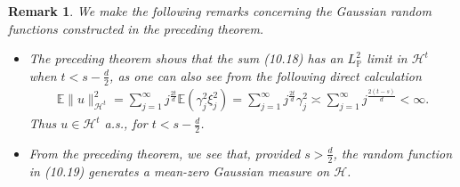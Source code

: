 \documentclass[oneside,11pt]{book}
\numberwithin{equation}{section}
\newtheorem{remark}{Remark}[section]
\begin{document}
\begin{remark}
    We make the following remarks concerning the Gaussian random functions constructed in the preceding theorem.
    \begin{itemize}
        \item The preceding theorem shows that the sum (10.18) has an $L_{\mathbb{P}}^2$ limit in $\mathcal{H}^t$ when $t < s - \frac{d}{2}$, as one can also see from the following direct calculation
        \begin{align*}
            \mathbb{E}\|u\|_{\mathcal{H}^t}^2 = \sum_{j=1}^\infty j^{\frac{2t}{d}}\mathbb{E}(\gamma_j^2\xi_j^2) = \sum_{j=1}^\infty j^{\frac{2t}{d}}\gamma_j^2\asymp\sum_{j=1}^\infty j^{\frac{2(t - s)}{d}} < \infty.
        \end{align*}
        Thus $u\in\mathcal{H}^t$ a.s., for $t < s - \frac{d}{2}$.
        \item From the preceding theorem, we see that, provided $s > \frac{d}{2}$, the random function in (10.19) generates a mean-zero Gaussian measure on $\mathcal{H}$.
        

\end{itemize}
\end{remark}
\end{document}
